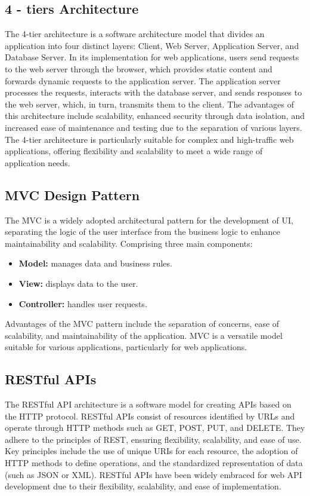 \subsection{4 - tiers Architecture}
The 4-tier architecture is a software architecture model that divides an application into four distinct layers: Client, Web Server, Application Server, and Database Server. 
In its implementation for web applications, users send requests to the web server through the browser, which provides static content and forwards dynamic requests to the application server. 
The application server processes the requests, interacts with the database server, and sends responses to the web server, which, in turn, transmits them to the client.
The advantages of this architecture include scalability, enhanced security through data isolation, and increased ease of maintenance and testing due to the separation of various layers. 
The 4-tier architecture is particularly suitable for complex and high-traffic web applications, offering flexibility and scalability to meet a wide range of application needs.

\subsection{MVC Design Pattern}
The MVC is a widely adopted architectural pattern for the development of UI, separating the logic of the user interface from the business logic to enhance maintainability and scalability. 
Comprising three main components:
\begin{itemize}
    \item \textbf{Model:} manages data and business rules.
    \item \textbf{View:} displays data to the user.
    \item \textbf{Controller:} handles user requests.
\end{itemize} 
Advantages of the MVC pattern include the separation of concerns, ease of scalability, and maintainability of the application. 
MVC is a versatile model suitable for various applications, particularly for web applications.

\subsection{RESTful APIs}
The RESTful API architecture is a software model for creating APIs based on the HTTP protocol. 
RESTful APIs consist of resources identified by URLs and operate through HTTP methods such as GET, POST, PUT, and DELETE. 
They adhere to the principles of REST, ensuring flexibility, scalability, and ease of use. 
Key principles include the use of unique URIs for each resource, the adoption of HTTP methods to define operations, and the standardized representation of data (such as JSON or XML). 
RESTful APIs have been widely embraced for web API development due to their flexibility, scalability, and ease of implementation.

